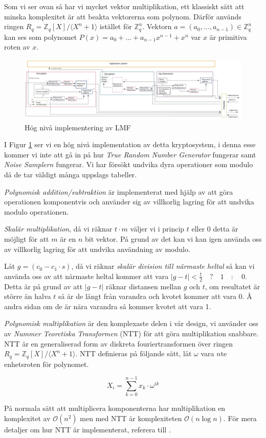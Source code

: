 \documentclass{paper}
\newcommand{\bZ}{\mathbb{Z}}
\begin{document}
Som vi ser ovan så har vi mycket vektor multiplikation, ett klassiskt sätt att
minska komplexitet är att beakta vektorerna som polynom. Därför används ringen
$R_q = \bZ_q [X] / \langle X^n + 1 \rangle$ istället för $\bZ^n_q$. Vektorn
$a = (a_0, \ldots, a_{n-1}) \in \bZ^n_q$ kan ses som polynomet
$P(x) = a_0 + \ldots + a_{n-1} x^{n-1} + x^n$ var $x$ är primitiva roten av
$x$.

\begin{figure}[H]
    \centering
    \includegraphics[scale=0.15]{high_level_impl.png}
    \caption{Hög nivå implementering av LMF \citep{FPGA_post_quantum}}
    \label{fig:high_level_impl}
\end{figure}

I Figur \ref{fig:high_level_impl} ser vi en hög nivå implementation av detta
kryptosystem, i denna esse kommer vi inte att gå in på hur \textit{True Random
Number Generator} fungerar samt \textit{Noise Samplern} fungerar. Vi har
försökt undvika dyra operationer som modulo då de tar väldigt många uppslags
tabeller.

\textit{Polynomisk addition/subtraktion} är implementerat med hjälp
av att göra operationen komponentvis och använder sig av villkorlig lagring
för att undvika modulo operationen.

\textit{Skalär multiplikation}, då vi räknar $t\cdot m$ väljer vi i princip
$t$ eller $0$ detta är möjligt för att $m$ är en $n$ bit vektor. På grund av
det kan vi kan igen använda oss av villkorlig lagring för att undvika
användning av modulo.

Låt $g = (c_0 - c_1 \cdot s)$, då vi räknar
\textit{skalär division till närmaste heltal} så kan vi använda oss av att
närmaste heltal kommer att vara $|g - t| < \frac{t}{2} \quad ? \quad 1 \quad :
\quad 0$. Detta är på grund av att $|g - t|$ räknar distansen mellan $g$ och
$t$, om resultatet är större än halva $t$ så är de långt från varandra och
kvotet kommer att vara 0. Å andra sidan om de är nära varandra så kommer
kvotet att vara 1.

\textit{Polynomisk multiplikation} är den komplexaste delen i vår design, vi
använder oss av \textit{Nummer Teoretiska Transformen} (NTT) för att göra
multiplikation snabbare. NTT är en generaliserad form av diskreta
fouriertransformen över ringen $R_q = \bZ_q[X] / \langle X^n + 1 \rangle$. NTT
definieras på följande sätt, låt $\omega$ vara $n$te enhetsroten för polynomet.

\[ X_i = \sum_{k=0}^{n-1}x_k \cdot \omega^{ik} \]

På normala sätt att multiplicera komponenterna har multiplikation en
komplexitet av $\mathcal{O}(n^2)$ men med NTT är komplexiteten
$\mathcal{O}(n\log n)$. För mera detaljer om hur NTT är implementerat, referera
till \citep{FPGA_post_quantum}.

\printbibliography
\end{document}
